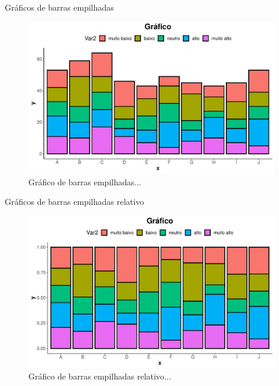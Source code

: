 \documentclass[
  ignorenonframetext,
  serif,
  professionalfont,
  usenames,
  dvipsnames,
  aspectratio = 169]{beamer}
\begin{document}
\begin{frame}{Gráficos de barras empilhadas}
\protect\hypertarget{gruxe1ficos-de-barras-empilhadas}{}
\begin{figure}

{\centering \includegraphics[width=11cm]{202-exploratoria-bivariada_files/figure-beamer/unnamed-chunk-7-1} 

}

\caption{Gráfico de barras empilhadas...}\label{fig:unnamed-chunk-7}
\end{figure}
\end{frame}

\begin{frame}{Gráficos de barras empilhadas relativo}
\protect\hypertarget{gruxe1ficos-de-barras-empilhadas-relativo}{}
\begin{figure}

{\centering \includegraphics[width=11cm]{202-exploratoria-bivariada_files/figure-beamer/unnamed-chunk-8-1} 

}

\caption{Gráfico de barras empilhadas relativo...}\label{fig:unnamed-chunk-8}
\end{figure}
\end{frame}
\end{document}
